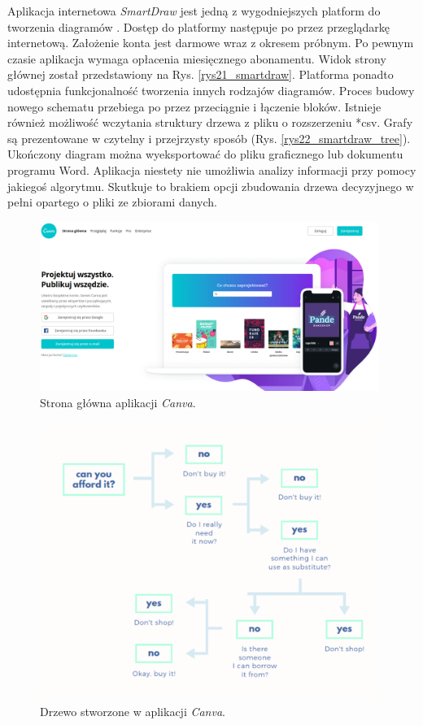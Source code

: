 Aplikacja internetowa \textit{SmartDraw} jest jedną z wygodniejszych platform do tworzenia diagramów \cite{misc_smartdraw}. Dostęp do platformy następuje po przez przeglądarkę internetową. Założenie konta jest darmowe wraz z okresem próbnym. Po pewnym czasie aplikacja wymaga opłacenia miesięcznego abonamentu. Widok strony głównej został przedstawiony na Rys. \ref{rys21_smartdraw}. Platforma ponadto udostępnia funkcjonalność tworzenia innych rodzajów diagramów. Proces budowy nowego schematu przebiega po przez przeciągnie i łączenie bloków. Istnieje również możliwość wczytania struktury drzewa z pliku o rozszerzeniu *csv. Grafy są prezentowane w czytelny i przejrzysty sposób (Rys. \ref{rys22_smartdraw_tree}). Ukończony diagram można wyeksportować do pliku graficznego lub dokumentu programu Word. Aplikacja niestety nie umożliwia analizy informacji przy pomocy jakiegoś algorytmu. Skutkuje to brakiem opcji zbudowania drzewa decyzyjnego w pełni opartego o pliki ze zbiorami danych. 

\begin{figure}[htb]
	\centering
	\includegraphics[width=11cm]{grafika/canva.eps}
	\caption{Strona główna aplikacji \textit{Canva}.}
	\label{rys23_canva}
\end{figure}

\begin{figure}[htb]
	\centering
	\includegraphics[width=11cm]{grafika/canvas_tree.eps}
	\caption{Drzewo stworzone w aplikacji \textit{Canva}.}
	\label{rys24_canva_tree}
\end{figure}

